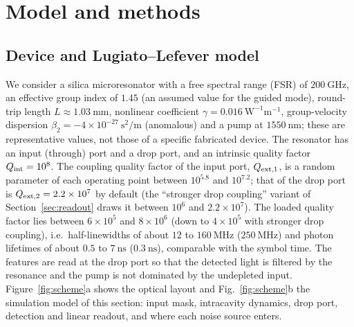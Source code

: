 \section{Model and methods}\label{sec:methods}

\subsection{Device and Lugiato--Lefever model}\label{sec:lle}

We consider a silica microresonator with a free spectral range (FSR) of $200~\mathrm{GHz}$, an effective group index of $1.45$
(an assumed value for the guided mode), round-trip length $L\approx1.03~\mathrm{mm}$, nonlinear coefficient
$\gamma=0.016~\mathrm{W^{-1}m^{-1}}$, group-velocity dispersion $\beta_2=-4\times10^{-27}~\mathrm{s^2/m}$ (anomalous) and a pump at
$1550~\mathrm{nm}$; these are representative values, not those of a specific fabricated device.
The resonator has an input (through) port and a drop port, and an intrinsic quality factor $Q_\mathrm{int}=10^{8}$.
The coupling quality factor of the input port, $Q_{\mathrm{ext},1}$, is a random parameter of each operating point between $10^{5.8}$ and
$10^{7.2}$; that of the drop port is $Q_{\mathrm{ext},2}=2.2\times10^{7}$ by default (the ``stronger drop coupling'' variant of
Section~\ref{sec:readout} draws it between $10^{6}$ and $2.2\times10^{7}$).
The loaded quality factor lies between $6\times10^{5}$ and $8\times10^{6}$ (down to $4\times10^{5}$ with stronger drop coupling),
i.e.\ half-linewidths of about $12$ to $160~\mathrm{MHz}$ ($250~\mathrm{MHz}$) and photon lifetimes of about $0.5$ to
$7~\mathrm{ns}$ ($0.3~\mathrm{ns}$), comparable with the symbol time. The features are read at the drop port so that the detected
light is filtered by the resonance and the pump is not dominated by the undepleted input.
Figure~\ref{fig:scheme}a shows the optical layout and Fig.~\ref{fig:scheme}b the simulation model of this section: input mask,
intracavity dynamics, drop port, detection and linear readout, and where each noise source enters.

